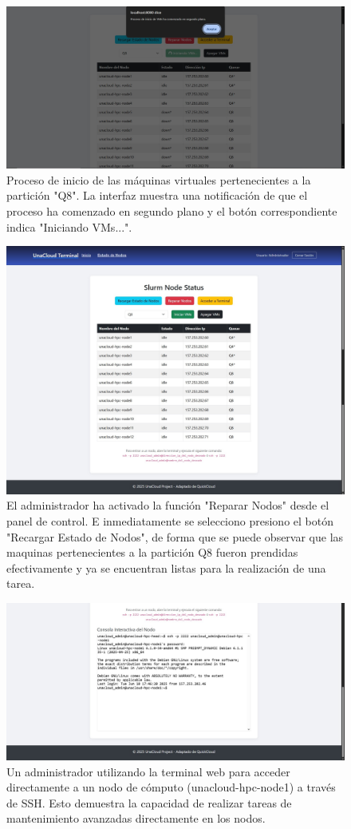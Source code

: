 \begin{figure}[H]
    \centering
    \includegraphics[width=0.75\linewidth]{Documento Final/Imagenes/Vms Q8 iniciadas.jpg}
    \caption{Proceso de inicio de las máquinas virtuales pertenecientes a la partición "Q8". La interfaz muestra una notificación de que el proceso ha comenzado en segundo plano y el botón correspondiente indica "Iniciando VMs...".}
    \label{fig:VMInit}
\end{figure}

\begin{figure}[H]
    \centering
    \includegraphics[width=0.75\linewidth]{Documento Final/Imagenes/NodosReparados_admin.jpg}
    \caption{El administrador ha activado la función "Reparar Nodos" desde el panel de control. E inmediatamente se selecciono presiono el botón "Recargar Estado de Nodos", de forma que se puede observar que las maquinas pertenecientes a la partición Q8 fueron prendidas efectivamente y ya se encuentran listas para la realización de una tarea.}
    \label{fig:UCRepair}
\end{figure}

\begin{figure}[H]
    \centering
    \includegraphics[width=0.75\linewidth]{Documento Final/Imagenes/IngresoANodoPorSSH.jpg}
    \caption{Un administrador utilizando la terminal web para acceder directamente a un nodo de cómputo (unacloud-hpc-node1) a través de SSH. Esto demuestra la capacidad de realizar tareas de mantenimiento avanzadas directamente en los nodos.}
    \label{fig:UCHop}
\end{figure}

